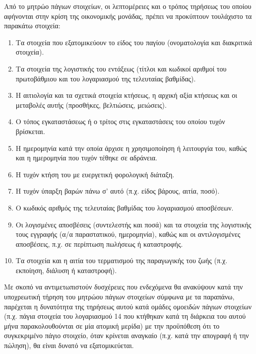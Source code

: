 \documentclass[A4,10pt,greek]{book}
\begin{document}
Από το μητρώο πάγιων στοιχείων, οι λεπτομέρειες και ο τρόπος τηρήσεως του οποίου αφήνονται στην κρίση της οικονομικής μονάδας, πρέπει να προκύπτουν τουλάχιστο τα παρακάτω στοιχεία:

\begin{enumerate}

\item Τα στοιχεία που εξατομικεύουν το είδος του παγίου (ονοματολογία και διακριτικά στοιχεία).

\item Τα στοιχεία της λογιστικής του εντάξεως (τίτλοι και κωδικοί αριθμοί του πρωτοβάθμιου και του λογαριασμού της τελευταίας βαθμίδας).

\item Η αιτιολογία και τα σχετικά στοιχεία κτήσεως, η αρχική αξία κτήσεως και οι μεταβολές αυτής (προσθήκες, βελτιώσεις, μειώσεις).

\item Ο τόπος εγκαταστάσεως ή ο τρίτος στις εγκαταστάσεις του οποίου τυχόν βρίσκεται.

\item Η ημερομηνία κατά την οποία άρχισε η χρησιμοποίηση ή λειτουργία του, καθώς και η ημερομηνία που τυχόν τέθηκε σε αδράνεια.

\item Η τυχόν κτήση του με ευεργετική φορολογική διάταξη.

\item Η τυχόν ύπαρξη βαρών πάνω σ' αυτό (π.χ. είδος βάρους, αιτία, ποσό).

\item Ο κωδικός αριθμός της τελευταίας βαθμίδας του λογαριασμού αποσβέσεων.

\item Οι λογισμένες αποσβέσεις (συντελεστής και ποσά) και τα στοιχεία της λογιστικής τους εγγραφής (α/α παραστατικού, ημερομηνία), καθώς και οι αντιλογισμένες αποσβέσεις, π.χ. σε περίπτωση πωλήσεως ή καταστροφής.

\item Τα στοιχεία και η αιτία του τερματισμού της παραγωγικής του ζωής (π.χ.  εκποίηση, διάλυση ή καταστροφή).

\end{enumerate}

Με σκοπό να αντιμετωπιστούν δυσχέρειες που ενδεχόμενα θα ανακύψουν κατά την υποχρεωτική τήρηση του μητρώου πάγιων στοιχείων σύμφωνα με τα παραπάνω, παρέχεται η δυνατότητα της τηρήσεως αυτού κατά ομάδες ομοειδών πάγιων στοιχείων (π.χ. πάγια στοιχεία του λογαριασμού 14 που κτήθηκαν κατά τη διάρκεια του αυτού μήνα παρακολουθούνται σε μία ατομική μερίδα) με την προϋπόθεση ότι το συγκεκριμένο πάγιο στοιχείο, όταν κρίνεται αναγκαίο (π.χ. κατά την απογραφή ή την πώληση), θα είναι δυνατό να εξατομικεύεται.
\end{document}
